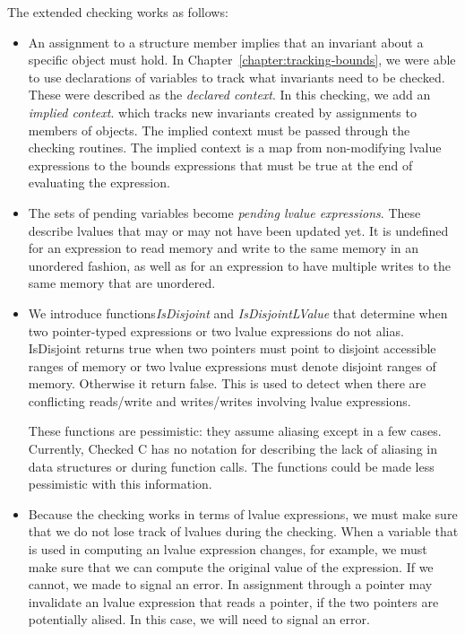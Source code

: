 The extended checking works as follows:
\begin{itemize}
\item An assignment to a structure member implies that an invariant about a specific
object must hold.  In Chapter~\ref{chapter:tracking-bounds}, we were able to use
declarations of variables to track what invariants need to be checked.    These were
described as  the {\em declared context}.  In this checking, we add an {\em implied context}.
which tracks new invariants created by assignments to members of objects.  The implied
context must be passed through the checking routines.   The implied context is a map
from non-modifying lvalue expressions to the bounds expressions that must be true at the
end of evaluating the expression.
\item The sets of pending variables become {\em pending lvalue expressions}.   These
describe lvalues that may or may not have been updated yet.   It is undefined for an expression
to read memory and write to the same memory in an unordered fashion, as well as for an 
expression to have multiple writes to the same memory that are unordered.  
\item We introduce functions{\em IsDisjoint} and {\em IsDisjointLValue} that determine when 
two pointer-typed expressions or two lvalue expressions do not alias. IsDisjoint returns
true when two  pointers must point to disjoint accessible ranges of memory  or two lvalue
expressions must denote disjoint ranges of memory. Otherwise it return false. This is used
to detect when there are  conflicting reads/write and writes/writes involving lvalue expressions.

These functions are pessimistic: they assume aliasing except in a few cases.  Currently, 
Checked C has no notation for describing the lack of aliasing in data structures or during
function calls. The functions could be made less pessimistic with this information.

\item Because the checking works in terms of lvalue expressions, we must make sure that we 
do not lose track of lvalues during the checking.  When a variable that is used in computing an
lvalue expression changes, for example, we must make sure that we can compute the original
value of the expression.  If we cannot, we made to signal an error.  In assignment through a pointer
may invalidate an lvalue expression that reads a pointer, if the two pointers are potentially alised.
In this case, we will need to signal an error.
\end{itemize}

